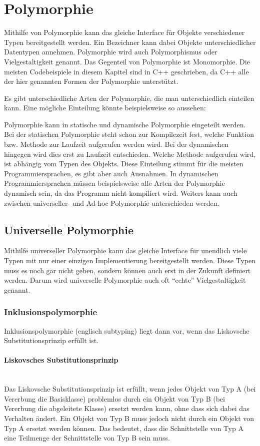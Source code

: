\section{Polymorphie}
	Mithilfe von Polymorphie kann das gleiche Interface für Objekte verschiedener Typen bereitgestellt werden. Ein Bezeichner
	kann dabei Objekte unterschiedlicher Datentypen annehmen. Polymorphie wird auch Polymorphismus oder Vielgestaltigkeit
	genannt. Das Gegenteil von Polymorphie ist Monomorphie. Die meisten Codebeispiele in diesem Kapitel sind in C++
	geschrieben, da C++ alle der hier genannten Formen der Polymorphie unterstützt.
	
	Es gibt unterschiedliche Arten der Polymorphie, die man unterschiedlich einteilen kann. Eine mögliche Einteilung könnte
	beispielsweise so aussehen:
	
	
	
	Polymorphie kann in statische und dynamische Polymorphie eingeteilt werden. Bei der statischen Polymorphie steht schon
	zur Kompilezeit fest, welche Funktion bzw. Methode zur Laufzeit aufgerufen werden wird. Bei der dynamischen hingegen
	wird dies erst zu Laufzeit entschieden. Welche Methode aufgerufen wird, ist abhängig vom Typen des Objekts.
	Diese Einteilung stimmt für die meisten Programmiersprachen, es gibt aber auch Ausnahmen. In dynamischen
	Programmiersprachen müssen beispielsweise alle Arten der Polymorphie dynamisch sein, da das Programm nicht kompiliert
	wird.
	Weiters kann auch zwischen universeller- und Ad-hoc-Polymorphie unterschieden werden.

	\subsection{Universelle Polymorphie}
		Mithilfe universeller Polymorphie kann das gleiche Interface für unendlich viele Typen mit nur einer einzigen Implementierung bereitgestellt werden. Diese
		Typen muss es noch gar nicht geben, sondern können auch erst in der Zukunft definiert werden. Darum wird
		universelle Polymorphie auch oft ``echte'' Vielgestaltigkeit genannt.
		
		\subsubsection{Inklusionspolymorphie}
			Inklusionspolymorphie (englisch subtyping) liegt dann vor, wenn das Liskovsche Substitutionsprinzip erfüllt ist.
			
			\paragraph{Liskovsches Substitutionsprinzip}\mbox{}\\
				Das Liskovsche Substitutionsprinzip ist erfüllt, wenn jedes Objekt von Typ A (bei Vererbung die
				Basisklasse) problemlos durch ein Objekt von Typ B (bei Vererbung die abgeleitete Klasse) ersetzt werden
				kann, ohne dass sich dabei das Verhalten ändert. Ein Objekt von Typ B muss jedoch nicht durch ein Objekt
				von Typ A ersetzt werden können. Das bedeutet, dass die Schnittstelle von Typ A eine Teilmenge der
				Schnittstelle von Typ B sein muss.
		
